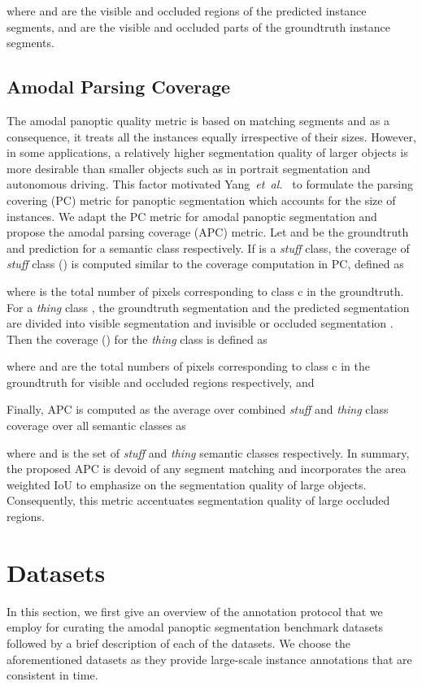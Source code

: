 \documentclass[10pt,twocolumn,letterpaper]{article}
\begin{document}
where  and  are the visible and occluded regions of the predicted instance segments,  and  are the visible and occluded parts of the groundtruth instance segments. 



\subsection{Amodal Parsing Coverage}

The amodal panoptic quality metric is based on matching segments and as a consequence, it treats all the instances equally irrespective of their sizes. However, in some applications, a relatively higher segmentation quality of larger objects is more desirable than smaller objects such as in portrait segmentation and autonomous driving. This factor motivated Yang~\textit{et~al.}~\cite{yang2019deeperlab} to formulate the parsing covering (PC) metric for panoptic segmentation which accounts for the size of instances. We adapt the PC metric for amodal panoptic segmentation and propose the amodal parsing coverage (APC) metric. Let  and  be the groundtruth and prediction for a  semantic class respectively. If  is a \textit{stuff} class, the coverage of \textit{stuff} class  () is computed similar to the coverage computation in PC, defined as

where  is the total number of pixels corresponding to class c in the groundtruth. For a \textit{thing} class , the groundtruth segmentation  and the predicted segmentation  are divided into visible segmentation  and invisible or occluded segmentation . Then the coverage () for the \textit{thing} class  is defined as

where  and  are the total numbers of pixels corresponding to class c in the groundtruth for visible and occluded regions respectively, and


Finally, APC is computed as the average over combined \textit{stuff} and \textit{thing} class coverage over all semantic classes as

where  and  is the set of \textit{stuff} and  \textit{thing} semantic classes respectively. In summary, the proposed APC is devoid of any segment matching and incorporates the area weighted IoU to emphasize on the segmentation quality of large objects. Consequently, this metric accentuates segmentation quality of large occluded regions.
 
\section{Datasets}
In this section, we first give an overview of the annotation protocol that we employ for curating the amodal panoptic segmentation benchmark datasets followed by a brief description of each of the datasets. We choose the aforementioned datasets as they provide large-scale instance annotations that are consistent in time.
\end{document}
